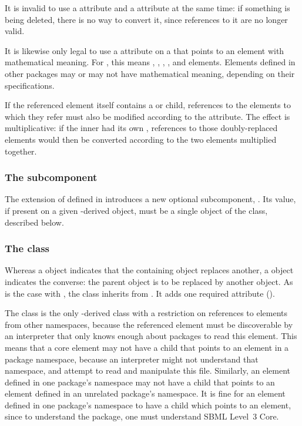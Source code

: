 It is invalid to use a  attribute and a
 attribute at the same time: if something is being
deleted, there is no way to convert it, since references to it are no
longer valid.

It is likewise only legal to use a  attribute on
a \ReplacedElement that points to an element with mathematical meaning.
For \sbmlthreecore, this means \Compartment, \Parameter, \Reaction,
\Species, and \SpeciesReference elements.  Elements defined in other
packages may or may not have mathematical meaning, depending on their
specifications.

If the referenced element itself contains a \ReplacedElement or \ReplacedBy child,
references to the elements to which they refer must also be modified according
to the  attribute.  The effect is multiplicative:
if the inner \ReplacedElement had its own , references
to those doubly-replaced elements would then be converted according to the
two  elements multiplied together.

\subsubsection{The \fixttspace{} subcomponent}

The extension of \SBase defined in  introduces a
new optional subcomponent, .  Its value, if present on
a given \SBase-derived object, must be a single object of the
\ReplacedBy class, described below.


\subsubsection{The  class}
\label{replacedby-class}

Whereas a \ReplacedElement object indicates that the containing object
replaces another, a \ReplacedBy object indicates the converse: the
parent object is to be replaced by another object.  As is the case with
\ReplacedElement, the \ReplacedBy class inherits from \SBaseRef.  It
adds one required attribute ().

The \ReplacedBy class is the only \SBaseRef-derived class with a
restriction on references to elements from other namespaces, because the
referenced element must be discoverable by an interpreter that only
knows enough about packages to read this element.  This means that a
core element may not have a \ReplacedBy child that points to an element
in a package namespace, because an interpreter might not understand that
namespace, and attempt to read and manipulate this file.  Similarly, an
element defined in one package's namespace may not have a \ReplacedBy
child that points to an element defined in an unrelated package's
namespace.  It is fine for an element defined in one package's namespace
to have a \ReplacedBy child which points to an \sbmlthreecore element,
since to understand the package, one must understand SBML Level~3 Core.


